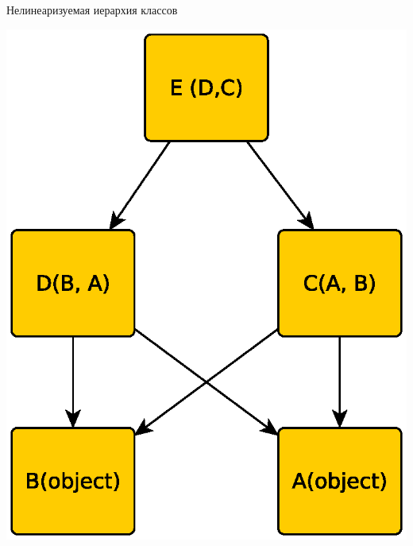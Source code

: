 \documentclass{article}
\begin{document}
\begin{center}Нелинеаризуемая иерархия классов\end{center}
\begin{center} \includegraphics{images/linearization_fail.eps} \end{center} 
\newpage
\end{document}
